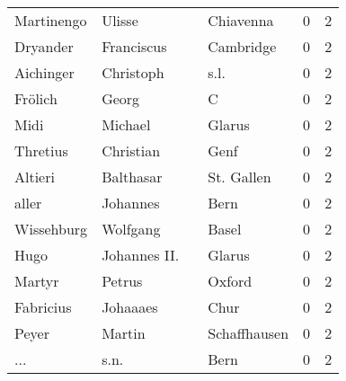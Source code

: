\begin{tabular}{llllrr}
               Martinengo &                             Ulisse &             &                                   Chiavenna &          0 &         2 \\
                 Dryander &                         Franciscus &             &                                   Cambridge &          0 &         2 \\
                Aichinger &                          Christoph &             &                                        s.l. &          0 &         2 \\
                  Frölich &                              Georg &             &                                           C &          0 &         2 \\
                     Midi &                            Michael &             &                                      Glarus &          0 &         2 \\
                 Thretius &                          Christian &             &                                        Genf &          0 &         2 \\
                  Altieri &                          Balthasar &             &                                  St. Gallen &          0 &         2 \\
                    aller &                           Johannes &             &                                        Bern &          0 &         2 \\
               Wissehburg &                           Wolfgang &             &                                       Basel &          0 &         2 \\
                     Hugo &                       Johannes II. &             &                                      Glarus &          0 &         2 \\
                   Martyr &                             Petrus &             &                                      Oxford &          0 &         2 \\
                Fabricius &                           Johaaaes &             &                                        Chur &          0 &         2 \\
                    Peyer &                             Martin &             &                                Schaffhausen &          0 &         2 \\
                      ... &                               s.n. &             &                                        Bern &          0 &         2 \\

\end{tabular}
